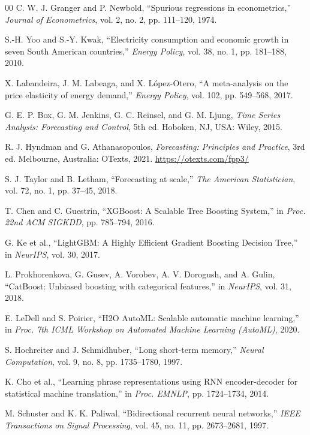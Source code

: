 \documentclass[conference]{IEEEtran}
\begin{document}
\begin{thebibliography}{00}
C. W. J. Granger and P. Newbold, ``Spurious regressions in econometrics,'' \textit{Journal of Econometrics}, vol. 2, no. 2, pp. 111--120, 1974.

S.-H. Yoo and S.-Y. Kwak, ``Electricity consumption and economic growth in seven South American countries,'' \textit{Energy Policy}, vol. 38, no. 1, pp. 181--188, 2010.

X. Labandeira, J. M. Labeaga, and X. López-Otero, ``A meta-analysis on the price elasticity of energy demand,'' \textit{Energy Policy}, vol. 102, pp. 549--568, 2017.

G. E. P. Box, G. M. Jenkins, G. C. Reinsel, and G. M. Ljung, \textit{Time Series Analysis: Forecasting and Control}, 5th ed. Hoboken, NJ, USA: Wiley, 2015.

R. J. Hyndman and G. Athanasopoulos, \textit{Forecasting: Principles and Practice}, 3rd ed. Melbourne, Australia: OTexts, 2021. \url{https://otexts.com/fpp3/}

S. J. Taylor and B. Letham, ``Forecasting at scale,'' \textit{The American Statistician}, vol. 72, no. 1, pp. 37--45, 2018.

T. Chen and C. Guestrin, ``XGBoost: A Scalable Tree Boosting System,'' in \textit{Proc. 22nd ACM SIGKDD}, pp. 785--794, 2016.

G. Ke et al., ``LightGBM: A Highly Efficient Gradient Boosting Decision Tree,'' in \textit{NeurIPS}, vol. 30, 2017.

L. Prokhorenkova, G. Gusev, A. Vorobev, A. V. Dorogush, and A. Gulin, ``CatBoost: Unbiased boosting with categorical features,'' in \textit{NeurIPS}, vol. 31, 2018.

E. LeDell and S. Poirier, ``H2O AutoML: Scalable automatic machine learning,'' in \textit{Proc. 7th ICML Workshop on Automated Machine Learning (AutoML)}, 2020.

S. Hochreiter and J. Schmidhuber, ``Long short-term memory,'' \textit{Neural Computation}, vol. 9, no. 8, pp. 1735--1780, 1997.

K. Cho et al., ``Learning phrase representations using RNN encoder-decoder for statistical machine translation,'' in \textit{Proc. EMNLP}, pp. 1724--1734, 2014.

M. Schuster and K. K. Paliwal, ``Bidirectional recurrent neural networks,'' \textit{IEEE Transactions on Signal Processing}, vol. 45, no. 11, pp. 2673--2681, 1997.


\end{thebibliography}
\end{document}
